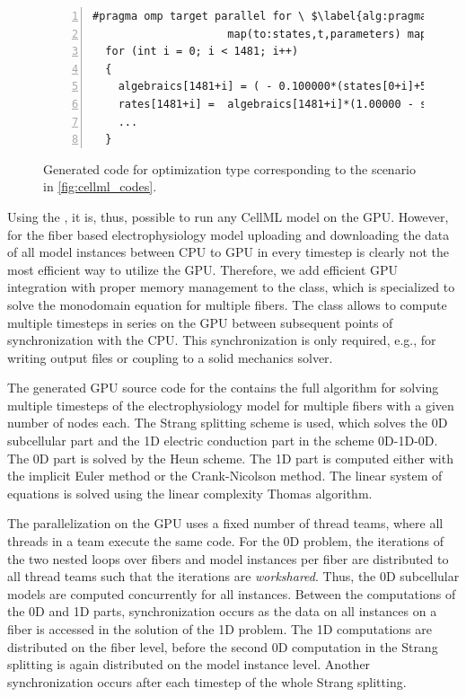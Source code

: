 \begin{figure}
\centering
\begin{framed}
\begin{lstlisting}[basicstyle=\footnotesize\ttfamily,commentstyle=\color{gray},numbers=left]
  #pragma omp target parallel for \ $\label{alg:pragma_line}$
                     map(to:states,t,parameters) map(from:rates,algebraics) $\label{alg:pragma_line2}$
  for (int i = 0; i < 1481; i++)
  {
    algebraics[1481+i] = ( - 0.100000*(states[0+i]+50.0000))/(exp(- (states[0+i]+5
    rates[1481+i] =  algebraics[1481+i]*(1.00000 - states[1481+i]) -  algebraics[7
    ...
  }
\end{lstlisting}
\end{framed}
\caption{Generated code for optimization type  corresponding to the scenario in \cref{fig:cellml_codes}.}%
\label{fig:cellml_codes_gpu}%
\end{figure}

Using the , it is, thus, possible to run any CellML model on the GPU. 
However, for the fiber based electrophysiology model uploading and downloading the data of all model instances between CPU to GPU in every timestep is clearly not the most efficient way to utilize the GPU. Therefore, we add efficient GPU integration with proper memory management to the  class, which is specialized to solve the monodomain equation for multiple fibers. The class allows to compute multiple timesteps in series on the GPU between subsequent points of synchronization with the CPU. This synchronization is only required, e.g., for writing output files or coupling to a solid mechanics solver.

The generated GPU source code for the  contains the full algorithm for solving multiple timesteps of the electrophysiology model for multiple fibers with a given number of nodes each. The Strang splitting scheme is used, which solves the 0D subcellular part and the 1D electric conduction part in the scheme 0D-1D-0D.
The 0D part is solved by the Heun scheme. The 1D part is computed either with the implicit Euler method or the Crank-Nicolson method. The linear system of equations is solved using the linear complexity Thomas algorithm.

The parallelization on the GPU uses a fixed number of thread teams, where all threads in a team execute the same code.
For the 0D problem, the iterations of the two nested loops over fibers and model instances per fiber are distributed to all thread teams such that the iterations are \emph{workshared}. Thus, the 0D subcellular models are computed concurrently for all instances. Between the computations of the 0D and 1D parts, synchronization occurs as the data on all instances on a fiber is accessed in the solution of the 1D problem. The 1D computations are distributed on the fiber level, before the second 0D computation in the Strang splitting is again distributed on the model instance level.
Another synchronization occurs after each timestep of the whole Strang splitting.

